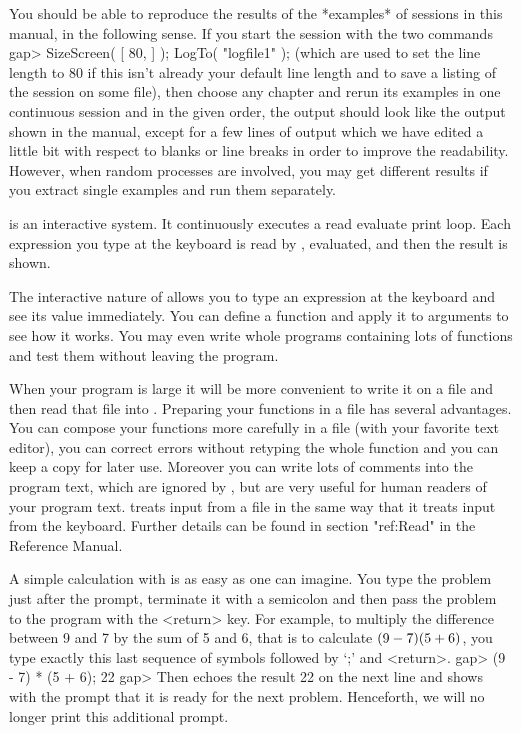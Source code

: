 You should be able to reproduce the results of the *examples* of {\GAP}
sessions in this manual, in the following sense.
If you start the {\GAP} session with the two commands
\begintt
gap> SizeScreen( [ 80, ] ); LogTo( "logfile1" );
\endtt
(which are used to set the line length to 80 if this isn't already your
default line length and to save a listing of
the session on some file), then choose any chapter and rerun its
examples in one continuous session and in the given order, the {\GAP}
output should look like the output shown in the manual, except for a
few lines of output which we have edited a little bit with respect to
blanks or line breaks in order to improve the readability.  However,
when random processes are involved, you may get different results if
you extract single examples and run them separately.

\null

{\GAP}  is  an   interactive   system.    It  continuously   executes   a
read evaluate print loop.  Each  expression you type  at the  keyboard is
read by {\GAP}, evaluated, and then the result is shown.

The interactive nature of {\GAP} allows you to type  an expression at the
keyboard and see its value immediately.  You can  define a  function  and
apply it to arguments  to  see how  it  works.  You may  even write whole
programs containing lots  of functions and test them without leaving  the
program.

When  your program is large it  will be more  convenient to write it on a
file and then read that file  into {\GAP}. Preparing  your functions in a
file   has  several advantages.  You  can   compose  your functions  more
carefully in a  file (with your favorite  text  editor), you can  correct
errors without retyping  the whole function and you  can keep a  copy for
later use. Moreover you can write lots of comments into the program text,
which are ignored  by {\GAP}, but are   very useful for  human readers of
your program text. {\GAP} treats  input from a  file in the same way that
it treats input from the keyboard. Further details can be found in
section "ref:Read" in the Reference Manual.

A simple calculation with {\GAP} is as easy as one can imagine.  You type
the problem just after the prompt, terminate it with a semicolon and then
pass the problem to the  program with the <return> key.  For  example, to
multiply the difference between 9 and 7 by the sum of 5 and 6, that is to
calculate  $(9 - 7) \* (5 + 6)$, you type exactly this  last sequence  of
symbols followed by `;' and <return>.
\beginexample
gap> (9 - 7) * (5 + 6);
22
gap> 
\endexample
Then {\GAP} echoes   the result 22 on the   next line and shows with  the
prompt  that it is ready  for the  next problem.  Henceforth,  we will no
longer print this additional prompt.

